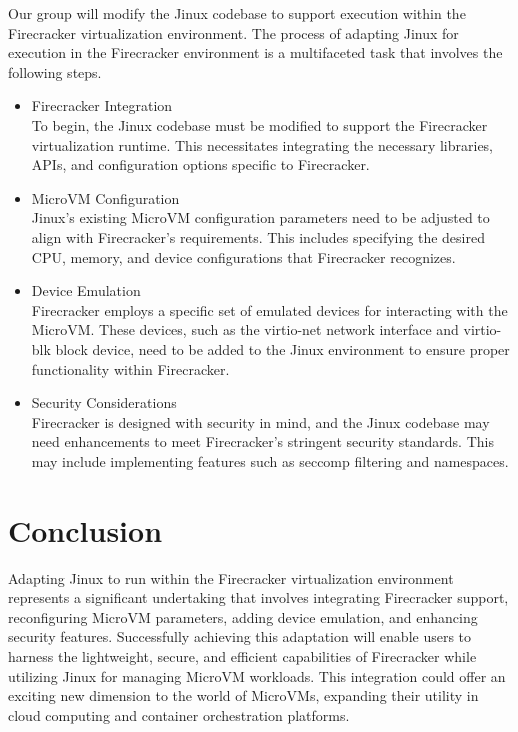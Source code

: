 \documentclass[conference]{IEEEtran}
\begin{document}
Our group will modify the Jinux codebase to support execution within the Firecracker virtualization environment. The process of adapting Jinux for execution in the Firecracker environment is a multifaceted task that involves the following steps.
\begin{itemize}
	\item Firecracker Integration\\
		To begin, the Jinux codebase must be modified to support the Firecracker virtualization runtime. This necessitates integrating the necessary libraries, APIs, and configuration options specific to Firecracker.
	\item MicroVM Configuration\\
		Jinux's existing MicroVM configuration parameters need to be adjusted to align with Firecracker's requirements. This includes specifying the desired CPU, memory, and device configurations that Firecracker recognizes.
	\item Device Emulation\\
		Firecracker employs a specific set of emulated devices for interacting with the MicroVM. These devices, such as the virtio-net network interface and virtio-blk block device, need to be added to the Jinux environment to ensure proper functionality within Firecracker.
	\item Security Considerations\\
		Firecracker is designed with security in mind, and the Jinux codebase may need enhancements to meet Firecracker's stringent security standards. This may include implementing features such as seccomp filtering and namespaces.
\end{itemize}

\section{Conclusion}

Adapting Jinux to run within the Firecracker virtualization environment represents a significant undertaking that involves integrating Firecracker support, reconfiguring MicroVM parameters, adding device emulation, and enhancing security features. Successfully achieving this adaptation will enable users to harness the lightweight, secure, and efficient capabilities of Firecracker while utilizing Jinux for managing MicroVM workloads. This integration could offer an exciting new dimension to the world of MicroVMs, expanding their utility in cloud computing and container orchestration platforms.
\end{document}
